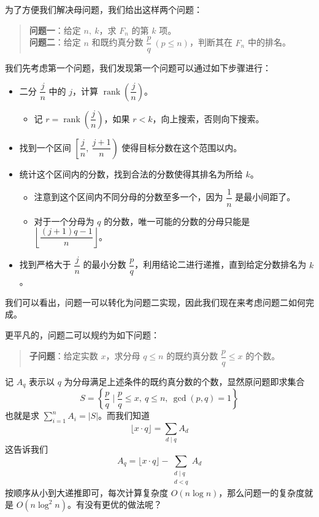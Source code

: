 为了方便我们解决母问题，我们给出这样两个问题：
\begin{quote}
    \textbf{问题一}：给定 $n,\ k$，求 $F_n$ 的第 $k$ 项。\\
    \textbf{问题二}：给定 $n$ 和既约真分数 $\dfrac{p}{q}\ (p \le n)$，判断其在 $F_n$ 中的排名。
\end{quote}

我们先考虑第一个问题，我们发现第一个问题可以通过如下步骤进行：
\begin{itemize}
    \item 二分 $\dfrac{j}{n}$ 中的 $j$，计算 $\operatorname{rank}\!\left(\dfrac{j}{n}\right)$。
    \begin{itemize}
        \item 记 $r = \operatorname{rank}\!\left(\dfrac{j}{n}\right)$，如果 $r < k$，向上搜索，否则向下搜索。
    \end{itemize}
    \item 找到一个区间 $\left[\dfrac{j}{n},\ \dfrac{j+1}{n}\right)$ 使得目标分数在这个范围以内。
    \item 统计这个区间内的分数，找到合法的分数使得其排名为所给 $k$。
    \begin{itemize}
        \item 注意到这个区间内不同分母的分数至多一个，因为 $\dfrac{1}{n}$ 是最小间距了。
        \item 对于一个分母为 $q$ 的分数，唯一可能的分数的分母只能是 $\left\lfloor\dfrac{(j+1)q-1}{n}\right\rfloor$。
    \end{itemize}
    \item 找到严格大于 $\dfrac{j}{n}$ 的最小分数 $\dfrac{p}{q}$，利用结论二进行递推，直到给定分数排名为 $k$。
\end{itemize}
我们可以看出，问题一可以转化为问题二实现，因此我们现在来考虑问题二如何完成。

更平凡的，问题二可以规约为如下问题：
\begin{quote}
    \textbf{子问题}：给定实数 $x$，求分母 $q \le n$ 的既约真分数 $\dfrac{p}{q} \le x$ 的个数。
\end{quote}
记 $A_q$ 表示以 $q$ 为分母满足上述条件的既约真分数的个数，显然原问题即求集合
\[
S = \left\{\frac{p}{q} \;\bigg|\; \frac{p}{q} \le x,\ q \le n,\ \gcd(p,q)=1\right\}
\]
也就是求 $\displaystyle\sum_{i=1}^{n} A_i = |S|$。而我们知道
\[
\lfloor x \cdot q \rfloor = \sum_{d\mid q} A_d
\]
这告诉我们
\[
A_q = \lfloor x \cdot q \rfloor - \sum_{\substack{d\mid q \\ d < q}} A_d
\]
按顺序从小到大递推即可，每次计算复杂度 $O(n\log n)$，那么问题一的复杂度就是 $O(n\log^2 n)$。有没有更优的做法呢？

